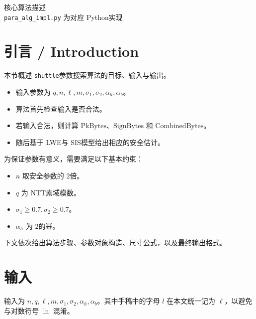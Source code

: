 \documentclass[11pt]{article}
\newcommand{\zh}[1]{{\zhfont #1}}
\begin{document}
\begin{center}
{\LARGE \zh{核心算法描述}}\\[0.4em]
{\small \texttt{para\_alg\_impl.py} {\zhfont 为对应 }Python{\zhfont 实现}}
\end{center}

\section*{\zh{引言} / Introduction}

{\zhfont 本节概述 }\texttt{shuttle}{\zhfont 参数搜索算法的目标、输入与输出。}

\begin{itemize}
  \item {\zhfont 输入参数为 }$q,n,\ell,m,\sigma_1,\sigma_2,\alpha_h,\alpha_b${\zhfont 。}
  \item {\zhfont 算法首先检查输入是否合法。}
  \item {\zhfont 若输入合法，则计算 }$\mathrm{PkBytes}${\zhfont 、}$\mathrm{SignBytes}$ {\zhfont 和 }$\mathrm{CombinedBytes}${\zhfont 。}
  \item {\zhfont 随后基于 }LWE{\zhfont 与 }SIS{\zhfont 模型给出相应的安全估计。}
\end{itemize}

{\zhfont 为保证参数有意义，需要满足以下基本约束：}

\begin{itemize}
  \item $n$ {\zhfont 取安全参数的 }$2${\zhfont 倍。}
  \item $q$ {\zhfont 为 }NTT{\zhfont 素域模数。}
  \item $\sigma_1 \ge 0.7,\sigma_2 \ge 0.7${\zhfont 。}
  \item $\alpha_h$ {\zhfont 为 }$2${\zhfont 的幂。}
\end{itemize}

{\zhfont 下文依次给出算法步骤、参数对象构造、尺寸公式，以及最终输出格式。}


\section*{\zh{输入}}
{\zhfont 输入为 $n,q,\ell,m,\sigma_1,\sigma_2,\alpha_h,\alpha_b$。其中手稿中的字母 $l$ 在本文统一记为 $\ell$，以避免与对数符号 $\ln$ 混淆。}
\end{document}
